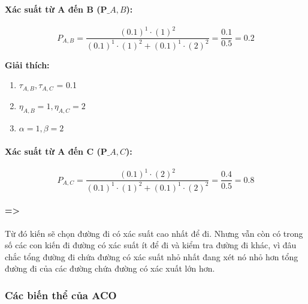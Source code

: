 \documentclass[14pt]{article}
\begin{document}
	\paragraph{Xác suất từ A đến B (P$\_{A,B}$):}
		\begin{center}
			\[
			P_{A,B} = \frac{(0.1)^1 \cdot (1)^2}{(0.1)^1 \cdot (1)^2 + (0.1)^1 \cdot (2)^2} = \frac{0.1}{0.5} = 0.2
			\]
		\end{center}
		\textbf{Giải thích:}
		\begin{enumerate}
			\item $\tau_{A,B}, \tau_{A,C}$ = 0.1
			
			\item $\eta_{A,B} = 1, \eta_{A,C} = 2$
			
			\item $\alpha = 1, \beta = 2$
		\end{enumerate}
	\paragraph{Xác suất từ A đến C (P$\_{A,C}$):}
	\begin{center}
		\[
		P_{A,C} = \frac{(0.1)^1 \cdot (2)^2}{(0.1)^1 \cdot (1)^2 + (0.1)^1 \cdot (2)^2} = \frac{0.4}{0.5} = 0.8
		\]
	\end{center}
	\paragraph{=>} Từ đó kiến sẽ chọn đường đi có xác suất cao nhất để đi. Nhưng vẫn còn có trong số các con kiến đi đường có xác suất ít để đi và kiểm tra đường đi khác, vì đâu chắc tổng đường đi chứa đường có xác suất nhỏ nhất đang xét nó nhỏ hơn tổng đường đi của các đường chứa đường có xác xuất lớn hơn.
	
	\newpage
	\subsubsection{Các biến thể của ACO}
	
\end{document}
